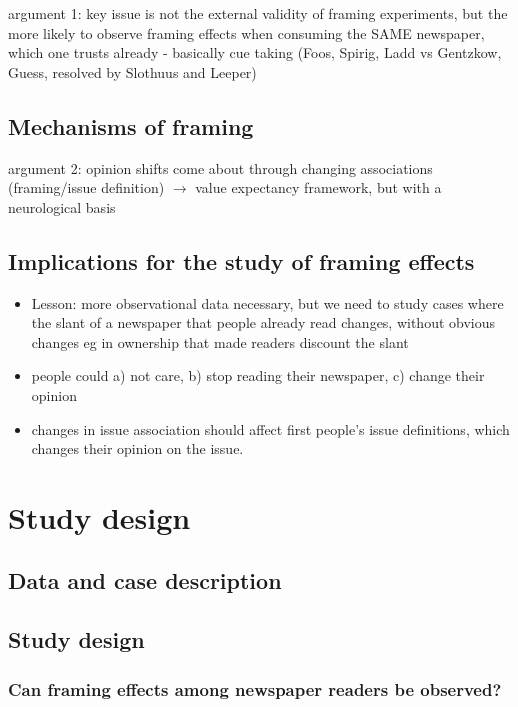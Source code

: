 \documentclass{article}
\begin{document}
argument 1: key issue is not the external validity of framing experiments, but the more likely to observe framing effects when consuming the SAME newspaper, which one trusts already - basically cue taking (Foos, Spirig, Ladd vs Gentzkow, Guess, resolved by Slothuus and Leeper)


\subsection{Mechanisms of framing}

argument 2: opinion shifts come about through changing associations (framing/issue definition) $\rightarrow$ value expectancy framework, but with a neurological basis


\subsection{Implications for the study of framing effects}
\begin{itemize}
\item Lesson: more observational data necessary, but we need to study cases where the slant of a newspaper that people already read changes, without obvious changes eg in ownership that made readers discount the slant
\item people could a) not care, b) stop reading their newspaper, c) change their opinion
\item changes in issue association should affect first people's issue definitions, which changes their opinion on the issue.
\end{itemize}

\section{Study design}

\subsection{Data and case description}



\subsection{Study design}

\subsubsection{Can framing effects among newspaper readers be observed?}
\end{document}
